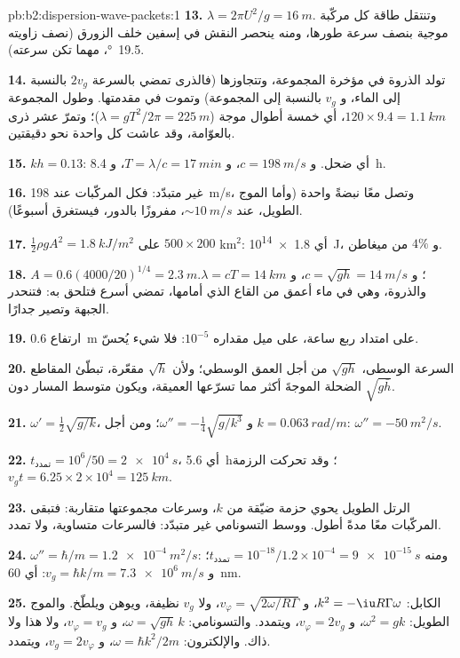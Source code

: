 \begin{solution}{pb:b2:dispersion-wave-packets:1}
\textbf{13.} $\lambda = 2\pi U^2/g = \qty{16}{m}$. وتنتقل طاقة كل مركّبة موجية
بنصف سرعة طورها، ومنه ينحصر النقش في إسفين
خلف الزورق (نصف زاويته \qty{19.5}{\degree}، مهما تكن سرعته).

\textbf{14.} تولد الذروة في مؤخرة المجموعة، وتتجاوزها
(فالذرى تمضي بالسرعة $2v_g$ بالنسبة إلى الماء، و $v_g$ بالنسبة إلى
المجموعة) وتموت في مقدمتها. وطول المجموعة $120 \times 9.4 = \qty{1.1}{km}$،
أي خمسة أطوال موجة ($\lambda = gT^2/2\pi = \qty{225}{m}$)؛ وتمرّ عشر ذرى بالعوّامة،
وقد عاشت كل واحدة نحو دقيقتين.

\textbf{15.} $kh = 0.13$: أي ضحل. و $c = \qty{198}{m/s}$، و $T = \lambda/c = \qty{17}{min}$،
و \qty{8.4}{h}.

\textbf{16.} غير متبدّد: فكل المركّبات عند \qty{198}{m/s}، وتصل
معًا نبضةً واحدة (وأما الموج الطويل، عند $\sim\qty{10}{m/s}$، مفروزًا بالدور،
فيستغرق أسبوعًا).

\textbf{17.} $\tfrac12\rho gA^2 = \qty{1.8}{kJ/m^2}$ على $500 \times 200$ km$^2$: أي \qty{1.8e14}{J}،
و $4\%$ من ميغاطن.

\textbf{18.} $A = 0.6(4000/20)^{1/4} = \qty{2.3}{m}$؛ و $c = \sqrt{gh} = \qty{14}{m/s}$، و $\lambda =
cT = \qty{14}{km}$. والذروة، وهي في ماء أعمق من القاع الذي أمامها،
تمضي أسرع فتلحق به: فتنحدر الجبهة وتصير جدارًا.

\textbf{19.} ارتفاع \qty{0.6}{m} على امتداد ربع ساعة، على ميل
مقداره $10^{-5}$: فلا شيء يُحسّ.

\textbf{20.} السرعة الوسطى، $\sqrt{gh}$ من أجل العمق الوسطي؛ ولأن
$\sqrt h$ مقعّرة، تبطّئ المقاطع الضحلة الموجةَ أكثر مما تسرّعها
العميقة، ويكون متوسط المسار دون $\sqrt{g\bar h}$.

\textbf{21.} $\omega' = \tfrac12\sqrt{g/k}$، و $\omega'' = -\tfrac14\sqrt{g/k^3}$؛ ومن أجل $k = \qty{0.063}{rad/m}$:
$\omega'' = \qty{-50}{m^2/s}$.

\textbf{22.} $t_{\text{تمدد}} = 10^6/50 = \qty{2e4}{s}$، أي \qty{5.6}{h}؛ وقد تحركت
الرزمة $v_gt = 6.25 \times 2 \times 10^4 = \qty{125}{km}$.

\textbf{23.} الرتل الطويل يحوي حزمة ضيّقة من $k$، وسرعات
مجموعتها متقاربة: فتبقى المركّبات معًا مدةً أطول. ووسط
التسونامي غير متبدّد: فالسرعات متساوية، ولا تمدد.

\textbf{24.} $\omega'' = \hbar/m = \qty{1.2e-4}{m^2/s}$: ومنه $t_{\text{تمدد}} = 10^{-18}/1.2 \times
10^{-4} = \qty{9e-15}{s}$؛ و $v_g = \hbar k/m = \qty{7.3e6}{m/s}$: أي \qty{60}{nm}.

\textbf{25.} الكابل: $k^2 = -\iu R\Gamma\omega$، و $v_\varphi = \sqrt{2\omega/R\Gamma}$، ولا
$v_g$ نظيفة، ويوهن ويلطّخ. والموج الطويل: $\omega^2 = gk$، و $v_\varphi = 2v_g$،
ويتمدد. والتسونامي: $\omega = \sqrt{gh}\,k$، و $v_\varphi = v_g$، ولا هذا ولا ذاك. والإلكترون:
$\omega = \hbar k^2/2m$، و $v_g = 2v_\varphi$، ويتمدد.
\end{solution}
